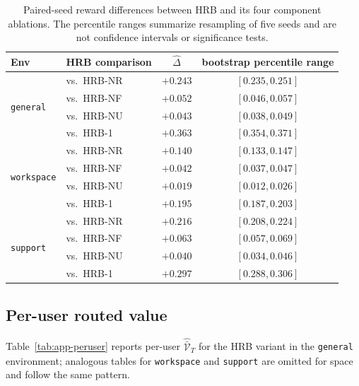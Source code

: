 \documentclass{article} %
\begin{document}
\begin{table}[h]
\centering
\small
\caption{Paired-seed reward differences between HRB and its four component ablations. The percentile ranges
summarize resampling of five seeds and are not confidence intervals or
significance tests.}
\label{tab:app-bootstrap}
\begin{tabular}{llcc}
\toprule
Env & HRB comparison & $\widehat\Delta$ & bootstrap percentile range \\
\midrule
\multirow{4}{*}{\texttt{general}}
 & vs.\ \textnormal{HRB-NR}         & $+0.243$ & $[0.235, 0.251]$ \\
 & vs.\ \textnormal{HRB-NF}      & $+0.052$ & $[0.046, 0.057]$ \\
 & vs.\ \textnormal{HRB-NU} & $+0.043$ & $[0.038, 0.049]$ \\
 & vs.\ \textnormal{HRB-1}         & $+0.363$ & $[0.354, 0.371]$ \\
\midrule
\multirow{4}{*}{\texttt{workspace}}
 & vs.\ \textnormal{HRB-NR}         & $+0.140$ & $[0.133, 0.147]$ \\
 & vs.\ \textnormal{HRB-NF}      & $+0.042$ & $[0.037, 0.047]$ \\
 & vs.\ \textnormal{HRB-NU} & $+0.019$ & $[0.012, 0.026]$ \\
 & vs.\ \textnormal{HRB-1}         & $+0.195$ & $[0.187, 0.203]$ \\
\midrule
\multirow{4}{*}{\texttt{support}}
 & vs.\ \textnormal{HRB-NR}         & $+0.216$ & $[0.208, 0.224]$ \\
 & vs.\ \textnormal{HRB-NF}      & $+0.063$ & $[0.057, 0.069]$ \\
 & vs.\ \textnormal{HRB-NU} & $+0.040$ & $[0.034, 0.046]$ \\
 & vs.\ \textnormal{HRB-1}         & $+0.297$ & $[0.288, 0.306]$ \\
\bottomrule
\end{tabular}

\end{table}

\subsection{Per-user routed value}

\label{app:tab-peruser}

Table~\ref{tab:app-peruser} reports per-user $\widehat{\bar{\mathcal V}}_T$ for the \textnormal{HRB} variant in the \texttt{general} environment; analogous tables for \texttt{workspace} and \texttt{support} are omitted for space and follow the same pattern.
\end{document}
